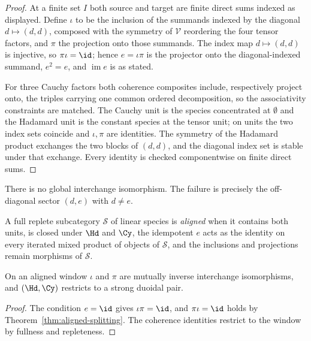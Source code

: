 \begin{proof}
At a finite set $I$ both source and target are finite direct sums indexed
as displayed. Define $\iota$ to be the inclusion of the summands indexed
by the diagonal $d\mapsto(d,d)$, composed with the symmetry of
$\mathcal V$ reordering the four tensor factors, and $\pi$ the projection
onto those summands. The index map $d\mapsto(d,d)$ is injective, so
$\pi\iota=\id$; hence $e=\iota\pi$ is the projector onto the
diagonal-indexed summand, $e^2=e$, and $\operatorname{im}e$ is as stated.

For three Cauchy factors both coherence composites include, respectively
project onto, the triples carrying one common ordered decomposition, so
the associativity constraints are matched. The Cauchy unit is the species
concentrated at $\emptyset$ and the Hadamard unit is the constant species
at the tensor unit; on units the two index sets coincide and $\iota,\pi$
are identities. The symmetry of the Hadamard product exchanges the two
blocks of $(d,d)$, and the diagonal index set is stable under that
exchange. Every identity is checked componentwise on finite direct sums.
\end{proof}

There is no global interchange isomorphism. The failure is precisely the
off-diagonal sector $(d,e)$ with $d\ne e$.

\begin{definition}
\label{def:aligned-window}
A full replete subcategory $\mathcal S$ of linear species is
\emph{aligned} when it contains both units, is closed under $\Hd$ and
$\Cy$, the idempotent $e$ acts as the identity on every iterated mixed
product of objects of $\mathcal S$, and the inclusions and projections
remain morphisms of $\mathcal S$.
\end{definition}

\begin{corollary}
\label{cor:aligned-duoidal}
\StatusProved{} On an aligned window $\iota$ and $\pi$ are mutually
inverse interchange isomorphisms, and $(\Hd,\Cy)$ restricts to a strong
duoidal pair.
\end{corollary}

\begin{proof}
The condition $e=\id$ gives $\iota\pi=\id$, and $\pi\iota=\id$ holds by
Theorem~\ref{thm:aligned-splitting}. The coherence identities restrict to
the window by fullness and repleteness.
\end{proof}

